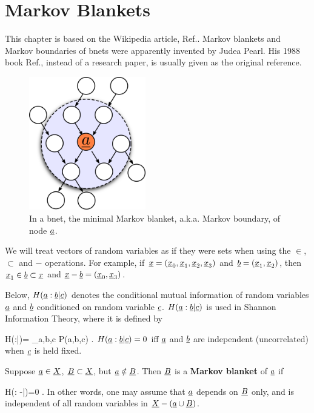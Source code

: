\chapter{Markov Blankets}\label{ch-mblanket}


This chapter is based on the
Wikipedia article, 
Ref.\cite{wiki-mblanket}.
Markov blankets
and Markov boundaries of bnets
were apparently invented
by Judea Pearl. His 1988 book
 Ref.\cite{pearl-1988book},
instead of a research paper, is 
usually given as the original reference.

\begin{figure}[h!]
\centering
\includegraphics[width=2in]{mblanket/mblanket.png}
\caption{In a bnet,
the minimal Markov blanket,
a.k.a. Markov boundary,
of node ${\underline{a}}$.} 
\label{fig-mblanket}
\end{figure}

We will treat vectors 
of random variables as if
they were sets when using the $\in$,
$\subset$ and $-$ operations.
For example,
if ${\underline{x}}=({\underline{x}}_0, 
{\underline{x}}_1, {\underline{x}}_2,
{\underline{x}}_3)$ and
${\underline{b}}=({\underline{x}}_1, {\underline{x}}_2)$,
then ${\underline{x}}_1\in {\underline{b}}\subset {\underline{x}}$ and
${\underline{x}}-{\underline{b}}=({\underline{x}}_0, {\underline{x}}_3)$.

Below, $H({\underline{a}}:{\underline{b}}|{\underline{c}})$
denotes the conditional
mutual information of
random variables
${\underline{a}}$ and ${\underline{b}}$
conditioned on 
random variable ${\underline{c}}$.
$H({\underline{a}}:{\underline{b}}|{\underline{c}})$
is used in Shannon Information
Theory, where it is defined by

\beq
H(\rva:\rvb|\rvc)=
\sum_{a,b,c}
P(a,b,c)\ln 
{}
\;.
\eeq
$H({\underline{a}}:{\underline{b}}|{\underline{c}})=0$
iff ${\underline{a}}$ and ${\underline{b}}$
are independent (uncorrelated)
when ${\underline{c}}$ is held fixed.



Suppose
${\underline{a}}\in  {\underline{X}}$,
 ${\underline{B}}\subset {\underline{X}}$,
but ${\underline{a}}\notin{\underline{B}}$.
Then ${\underline{B}}$ is a {\bf Markov blanket}
of ${\underline{a}}$ if

\beq
H(\rva: \rvX-\rva|\rvB)=0
\;.
\eeq
In other words, one may assume that
${\underline{a}}$ depends on ${\underline{B}}$ only, 
and is independent of all random
variables in ${\underline{X}}-({\underline{a}}\cup{\underline{B}})$.

